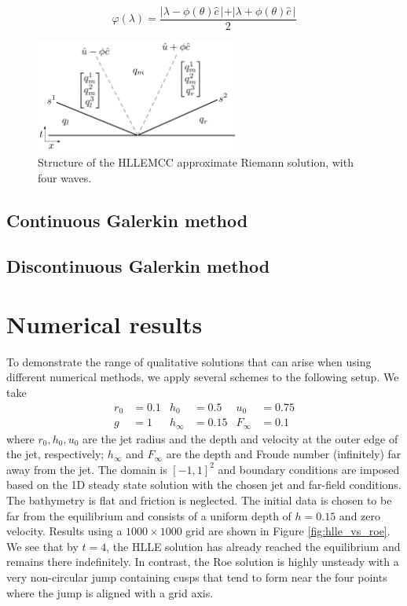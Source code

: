 \documentclass{article}
\begin{document}
\begin{equation}\nonumber
\varphi(\lambda)=\frac{\vert \lambda-\phi(\theta)\hat{c}\,\vert+\vert \lambda+\phi(\theta)\hat{c}\,\vert}{2}
\end{equation}

\begin{figure}
    \center
    \includegraphics[width=0.6\textwidth]{figures/hllemcc.pdf}
    \caption{Structure of the HLLEMCC approximate Riemann solution, with four waves.}
    \label{HLLEMCC}
\end{figure}

\subsection{Continuous Galerkin method}

\subsection{Discontinuous Galerkin method}

\section{Numerical results}

To demonstrate the range of qualitative solutions that can arise when using
different numerical methods, we apply several schemes to the following setup.
We take
\begin{align*}
    r_0 & = 0.1 & h_0 & = 0.5 & u_0 & = 0.75 \\
    g & = 1 & h_\infty & = 0.15 & F_\infty & = 0.1
\end{align*}
where $r_0, h_0, u_0$ are the jet radius and the depth and velocity at the outer
edge of the jet, respectively; $h_\infty$ and $F_\infty$ are the depth
and Froude number (infinitely) far away from the jet.  The domain is $[-1,1]^2$
and boundary conditions are imposed based on the 1D steady state solution with
the chosen jet and far-field conditions.  The bathymetry is flat and friction is
neglected.  The initial data is chosen to be far from the equilibrium and
consists of a uniform depth of $h=0.15$ and zero velocity.
Results using a $1000\times 1000$ grid are shown in Figure \ref{fig:hlle_vs_roe}.  
We see that by $t=4$, the HLLE solution has already reached the equilibrium
and remains there indefinitely.  In contrast, the Roe solution is highly
unsteady with a very non-circular jump containing cusps that tend to form
near the four points where the jump is aligned with a grid axis.
\end{document}
